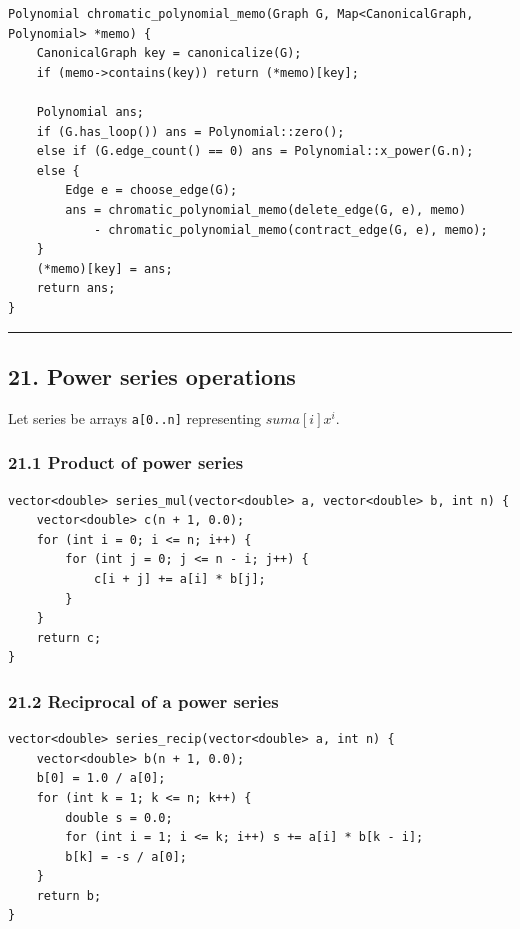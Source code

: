 \documentclass[11pt]{article}
\begin{document}
\begin{verbatim}
Polynomial chromatic_polynomial_memo(Graph G, Map<CanonicalGraph, Polynomial> *memo) {
    CanonicalGraph key = canonicalize(G);
    if (memo->contains(key)) return (*memo)[key];

    Polynomial ans;
    if (G.has_loop()) ans = Polynomial::zero();
    else if (G.edge_count() == 0) ans = Polynomial::x_power(G.n);
    else {
        Edge e = choose_edge(G);
        ans = chromatic_polynomial_memo(delete_edge(G, e), memo)
            - chromatic_polynomial_memo(contract_edge(G, e), memo);
    }
    (*memo)[key] = ans;
    return ans;
}
\end{verbatim}

\begin{center}\rule{0.5\linewidth}{0.5pt}\end{center}

\subsection{21. Power series operations}\label{power-series-operations}

Let series be arrays \texttt{a[0..n]} representing \(sum a[i] x^i\).

\subsubsection{21.1 Product of power series}\label{product-of-power-series}

\begin{verbatim}
vector<double> series_mul(vector<double> a, vector<double> b, int n) {
    vector<double> c(n + 1, 0.0);
    for (int i = 0; i <= n; i++) {
        for (int j = 0; j <= n - i; j++) {
            c[i + j] += a[i] * b[j];
        }
    }
    return c;
}
\end{verbatim}

\subsubsection{21.2 Reciprocal of a power series}\label{reciprocal-of-a-power-series}

\begin{verbatim}
vector<double> series_recip(vector<double> a, int n) {
    vector<double> b(n + 1, 0.0);
    b[0] = 1.0 / a[0];
    for (int k = 1; k <= n; k++) {
        double s = 0.0;
        for (int i = 1; i <= k; i++) s += a[i] * b[k - i];
        b[k] = -s / a[0];
    }
    return b;
}
\end{verbatim}
\end{document}
